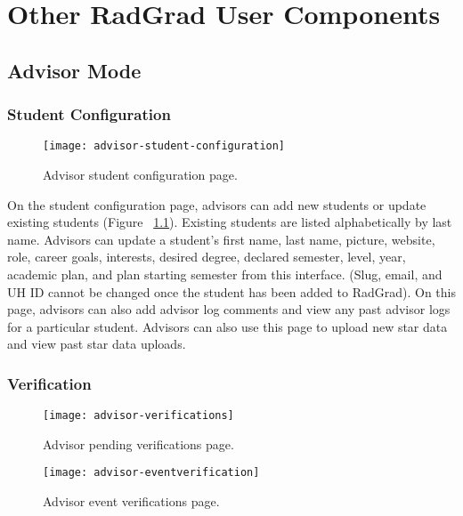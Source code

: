\chapter{Other RadGrad User Components}
\label{other-radgrad-components}
\section{Advisor Mode}
\subsection{Student Configuration}
\begin{figure}[htbp!]
\centering
\texttt{[image: advisor-student-configuration]}
\caption{Advisor student configuration page.}
\label{advisor-student-configuration}
\end{figure}
On the student configuration page, advisors can add new students or update existing students (Figure ~\ref{advisor-student-configuration}). Existing students are listed alphabetically by last name. Advisors can update a student's first name, last name, picture, website, role, career goals, interests, desired degree, declared semester, level, year, academic plan, and plan starting semester from this interface. (Slug, email, and UH ID cannot be changed once the student has been added to RadGrad). On this page, advisors can also add advisor log comments and view any past advisor logs for a particular student. Advisors can also use this page to upload new star data and view past star data uploads. 
\subsection{Verification}
\begin{figure}[htbp!]
\centering
\texttt{[image: advisor-verifications]}
\caption{Advisor pending verifications page.}
\label{advisor-verifications}
\end{figure}

\begin{figure}[htbp!]
\centering
\texttt{[image: advisor-eventverification]}
\caption{Advisor event verifications page.}
\label{advisor-event-verifications}
\end{figure}

